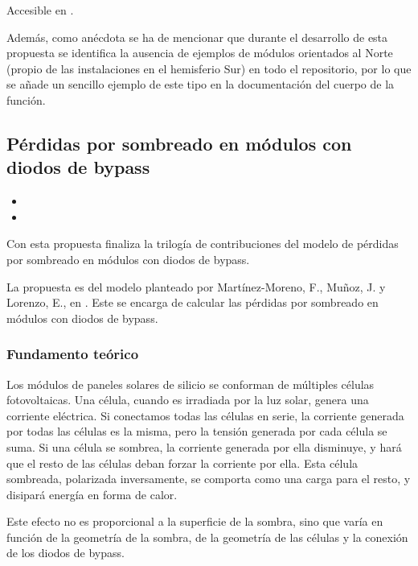 Accesible en .

Además, como anécdota se ha de mencionar que durante el desarrollo de esta propuesta se identifica la ausencia de ejemplos de módulos orientados al Norte (propio de las instalaciones en el hemisferio Sur) en todo el repositorio, por lo que se añade un sencillo ejemplo de este tipo en la documentación del cuerpo de la función.

\subsection{Pérdidas por sombreado en módulos con diodos de bypass} \label{sct:desarrollo:contribuciones_cientificas:perdidas_sombreado}

\begin{itemize}
    \item {}
    \item {}
\end{itemize}

Con esta propuesta finaliza la trilogía de contribuciones del modelo de pérdidas por sombreado en módulos con diodos de bypass.

La propuesta es del modelo planteado por Martínez-Moreno, F., Muñoz, J. y Lorenzo, E., en \cite{Martínez-Moreno_Muñoz_Lorenzo_2010}. Este se encarga de calcular las pérdidas por sombreado en módulos con diodos de bypass.

\subsubsection{Fundamento teórico}

Los módulos de paneles solares de silicio se conforman de múltiples células fotovoltaicas. Una célula, cuando es irradiada por la luz solar, genera una corriente eléctrica. Si conectamos todas las células en serie, la corriente generada por todas las células es la misma, pero la tensión generada por cada célula se suma. Si una célula se sombrea, la corriente generada por ella disminuye, y hará que el resto de las células deban forzar la corriente por ella. Esta célula sombreada, polarizada inversamente, se comporta como una carga para el resto, y disipará energía en forma de calor.

Este efecto no es proporcional a la superficie de la sombra, sino que varía en función de la geometría de la sombra, de la geometría de las células y la conexión de los diodos de bypass.

